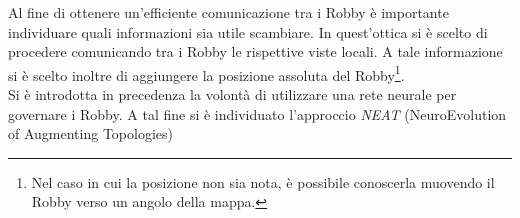 Al fine di ottenere un'efficiente comunicazione tra i Robby è importante
individuare quali informazioni sia utile scambiare. In quest'ottica si è scelto
di procedere comunicando tra i Robby le rispettive viste locali. A tale
informazione si è scelto inoltre di aggiungere la posizione assoluta del
Robby\footnote{Nel caso in cui la posizione non sia nota, è possibile conoscerla
muovendo il Robby verso un angolo della mappa.}.\\

Si è introdotta in precedenza la volontà di utilizzare una rete neurale per
governare i Robby. A tal fine si è individuato l'approccio \emph{NEAT}
(NeuroEvolution of Augmenting Topologies)\cite{stanley2002evolving}
